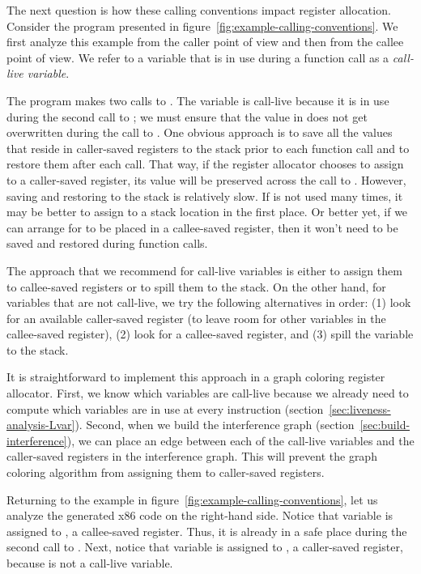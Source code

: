 \documentclass[7x10]{TimesAPriori_MIT}%
\numberwithin{theorem}{chapter}
\numberwithin{definition}{chapter}
\numberwithin{equation}{chapter}
\begin{document}
The next question is how these calling conventions impact register
allocation. Consider the \LangVar{} program presented in
figure~\ref{fig:example-calling-conventions}.  We first analyze this
example from the caller point of view and then from the callee point
of view. We refer to a variable that is in use during a function call
as a \emph{call-live variable}.

The program makes two calls to \READOP{}.  The variable  is
call-live because it is in use during the second call to \READOP{}; we
must ensure that the value in  does not get overwritten during
the call to \READOP{}.  One obvious approach is to save all the values
that reside in caller-saved registers to the stack prior to each
function call and to restore them after each call. That way, if the
register allocator chooses to assign  to a caller-saved
register, its value will be preserved across the call to \READOP{}.
However, saving and restoring to the stack is relatively slow. If
 is not used many times, it may be better to assign 
to a stack location in the first place. Or better yet, if we can
arrange for  to be placed in a callee-saved register, then it
won't need to be saved and restored during function calls.

The approach that we recommend for call-live variables is either to
assign them to callee-saved registers or to spill them to the
stack. On the other hand, for variables that are not call-live, we try
the following alternatives in order: (1) look for an available
caller-saved register (to leave room for other variables in the
callee-saved register), (2) look for a callee-saved register, and (3)
spill the variable to the stack.

It is straightforward to implement this approach in a graph coloring
register allocator. First, we know which variables are call-live
because we already need to compute which variables are in use at every
instruction (section~\ref{sec:liveness-analysis-Lvar}). Second, when
we build the interference graph
(section~\ref{sec:build-interference}), we can place an edge between
each of the call-live variables and the caller-saved registers in the
interference graph. This will prevent the graph coloring algorithm
from assigning them to caller-saved registers.

Returning to the example in
figure~\ref{fig:example-calling-conventions}, let us analyze the
generated x86 code on the right-hand side. Notice that variable
 is assigned to , a callee-saved register. Thus, it
is already in a safe place during the second call to
. Next, notice that variable  is assigned to
, a caller-saved register, because  is not a
call-live variable.
\end{document}
